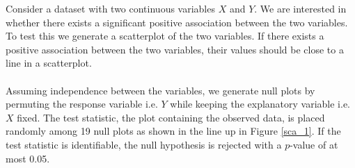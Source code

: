 \documentclass[12]{report}
\begin{document}
Consider a dataset with two continuous variables $X$ and $Y$. 
We are interested in whether there exists a significant positive association between the two variables. To test this we generate a scatterplot of the two variables. If there exists a positive association between the two variables, their values should be close to a line in a scatterplot. \\ \\%
Assuming independence between the variables, we generate null plots by permuting the response variable i.e. $Y$ while keeping the explanatory variable i.e. $X$ fixed. 
The test statistic, the plot containing the observed data, is placed randomly among 19 null plots as shown in the line up in  Figure \ref{sca_1}. If the test statistic is identifiable, the null hypothesis is rejected with a $p$-value of at most 0.05.\\


%
\end{document}
